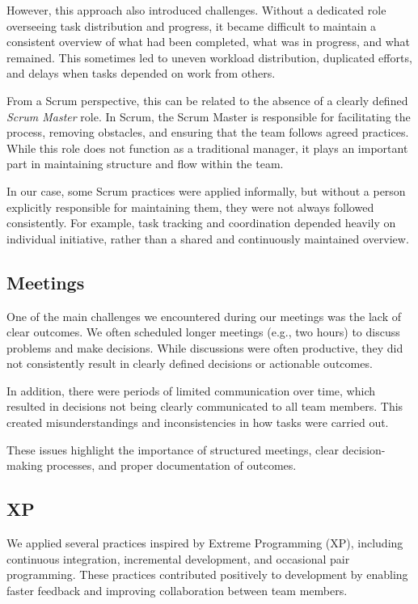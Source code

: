 However, this approach also introduced challenges.
Without a dedicated role overseeing task distribution and progress,
it became difficult to maintain a consistent overview of what had been completed,
what was in progress, and what remained.
This sometimes led to uneven workload distribution, duplicated efforts,
and delays when tasks depended on work from others.

From a Scrum perspective, this can be related to the absence of a clearly defined
\textit{Scrum Master} role.
In Scrum, the Scrum Master is responsible for facilitating the process,
removing obstacles, and ensuring that the team follows agreed practices.
While this role does not function as a traditional manager,
it plays an important part in maintaining structure and flow within the team.

In our case, some Scrum practices were applied informally,
but without a person explicitly responsible for maintaining them,
they were not always followed consistently.
For example, task tracking and coordination depended heavily on individual initiative,
rather than a shared and continuously maintained overview.

\subsection{Meetings}

One of the main challenges we encountered during our meetings was the lack of clear outcomes.
We often scheduled longer meetings (e.g., two hours) to discuss problems and make decisions.
While discussions were often productive,
they did not consistently result in clearly defined decisions or actionable outcomes.

In addition, there were periods of limited communication over time,
which resulted in decisions not being clearly communicated to all team members.
This created misunderstandings and inconsistencies in how tasks were carried out.

These issues highlight the importance of structured meetings,
clear decision-making processes, and proper documentation of outcomes.

\subsection{XP}

We applied several practices inspired by Extreme Programming (XP), including continuous integration,
incremental development, and occasional pair programming.
These practices contributed positively to development by enabling faster feedback
and improving collaboration between team members.

